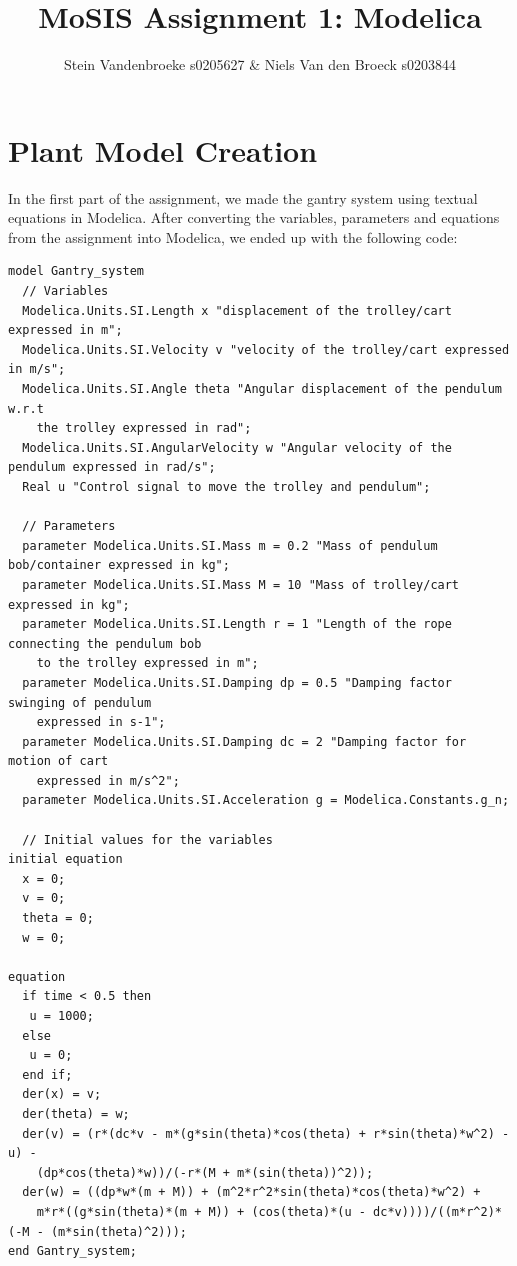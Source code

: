 \documentclass{article}
\title{MoSIS Assignment 1: Modelica}
\author{Stein Vandenbroeke s0205627 & Niels Van den Broeck s0203844}
\begin{document}
\maketitle

\section{Plant Model Creation}

In the first part of the assignment, we made the gantry system using textual equations in Modelica. After converting the variables, parameters and equations from the assignment into Modelica, we ended up with the following code:

\begin{verbatim}
model Gantry_system
  // Variables
  Modelica.Units.SI.Length x "displacement of the trolley/cart expressed in m";
  Modelica.Units.SI.Velocity v "velocity of the trolley/cart expressed in m/s";
  Modelica.Units.SI.Angle theta "Angular displacement of the pendulum w.r.t 
    the trolley expressed in rad";
  Modelica.Units.SI.AngularVelocity w "Angular velocity of the pendulum expressed in rad/s";
  Real u "Control signal to move the trolley and pendulum";
  
  // Parameters
  parameter Modelica.Units.SI.Mass m = 0.2 "Mass of pendulum bob/container expressed in kg";
  parameter Modelica.Units.SI.Mass M = 10 "Mass of trolley/cart expressed in kg";
  parameter Modelica.Units.SI.Length r = 1 "Length of the rope connecting the pendulum bob
    to the trolley expressed in m";
  parameter Modelica.Units.SI.Damping dp = 0.5 "Damping factor swinging of pendulum
    expressed in s-1";
  parameter Modelica.Units.SI.Damping dc = 2 "Damping factor for motion of cart
    expressed in m/s^2";
  parameter Modelica.Units.SI.Acceleration g = Modelica.Constants.g_n;
  
  // Initial values for the variables
initial equation
  x = 0;
  v = 0;
  theta = 0;
  w = 0;
  
equation  
  if time < 0.5 then
   u = 1000;
  else 
   u = 0;
  end if;
  der(x) = v;
  der(theta) = w;
  der(v) = (r*(dc*v - m*(g*sin(theta)*cos(theta) + r*sin(theta)*w^2) - u) - 
    (dp*cos(theta)*w))/(-r*(M + m*(sin(theta))^2));
  der(w) = ((dp*w*(m + M)) + (m^2*r^2*sin(theta)*cos(theta)*w^2) + 
    m*r*((g*sin(theta)*(m + M)) + (cos(theta)*(u - dc*v))))/((m*r^2)*(-M - (m*sin(theta)^2)));
end Gantry_system;
\end{verbatim}
\end{document}
